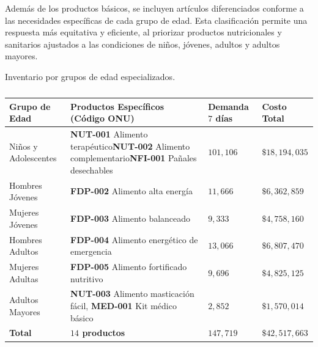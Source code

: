 \documentclass[
  spanish,
  us-letterpaper,
]{scrreprt}
\numberwithin{equation}{section}
\begin{document}
Además de los productos básicos, se incluyen artículos diferenciados
conforme a las necesidades específicas de cada grupo de edad. Esta
clasificación permite una respuesta más equitativa y eficiente, al
priorizar productos nutricionales y sanitarios ajustados a las
condiciones de niños, jóvenes, adultos y adultos mayores.

Inventario por grupos de edad especializados.

\begin{longtable}[]{@{}
  >{\centering\arraybackslash}p{}
  >{\centering\arraybackslash}p{}
  >{\centering\arraybackslash}p{}
  >{\centering\arraybackslash}p{}@{}}

\caption{\label{tbl-inventario-especializado}}

\tabularnewline

\toprule\noalign{}
\begin{minipage}[b]{\linewidth}\centering
\textbf{Grupo de Edad}
\end{minipage} & \begin{minipage}[b]{\linewidth}\centering
\textbf{Productos Específicos (Código ONU)}
\end{minipage} & \begin{minipage}[b]{\linewidth}\centering
\textbf{Demanda \(7\) días}
\end{minipage} & \begin{minipage}[b]{\linewidth}\centering
\textbf{Costo Total}
\end{minipage} \\
\midrule\noalign{}
\endhead
\bottomrule\noalign{}
\endlastfoot
Niños y Adolescentes & \textbf{NUT-001} Alimento
terapéutico\textbf{NUT-002} Alimento complementario\textbf{NFI-001}
Pañales desechables & \(101,106\) & \(\$18,194,035\) \\
Hombres Jóvenes & \textbf{FDP-002} Alimento alta energía & \(11,666\) &
\(\$6,362,859\) \\
Mujeres Jóvenes & \textbf{FDP-003} Alimento balanceado & \(9,333\) &
\(\$4,758,160\) \\
Hombres Adultos & \textbf{FDP-004} Alimento energético de emergencia &
\(13,066\) & \(\$6,807,470\) \\
Mujeres Adultas & \textbf{FDP-005} Alimento fortificado nutritivo &
\(9,696\) & \(\$4,825,125\) \\
Adultos Mayores & \textbf{NUT-003} Alimento masticación fácil,
\textbf{MED-001} Kit médico básico & \(2,852\) & \(\$1,570,014\) \\
\textbf{Total} & \textbf{\(14\) productos} & \textbf{\(147,719\)} &
\textbf{\(\$42,517,663\)} \\

\end{longtable}
\end{document}
